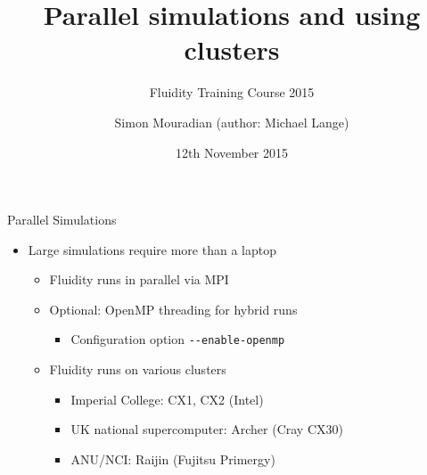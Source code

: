 \documentclass[t, hyperref={pdfpagelabels=false}]{beamer}
\title[Parallel Simulations]{Parallel simulations and using clusters}
\subtitle[]{Fluidity Training Course 2015}
\author[]{\footnotesize Simon Mouradian (author: Michael Lange)}
\institute{AMCG, Imperial College London}
\date{\footnotesize 12th November 2015}
\begin{document}
\titlepage

\begin{frame}{Parallel Simulations}
  \begin{itemize}
  \item[] Large simulations require more than a laptop
    \begin{itemize}
      \vspace{1em}
    \item Fluidity runs in parallel via MPI
    \item Optional: OpenMP threading for hybrid runs
      \begin{itemize}
      \item Configuration option \lstinline+--enable-openmp+
      \end{itemize}

      \vspace{1em}
    \item Fluidity runs on various clusters
      \begin{itemize}
      \item Imperial College: CX1, CX2 (Intel)
      \item UK national supercomputer: Archer (Cray CX30)
      \item ANU/NCI: Raijin (Fujitsu Primergy)
      \end{itemize}
    \end{itemize}
  \end{itemize}
\end{frame}
\end{document}
